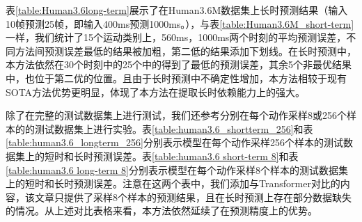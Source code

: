表\ref{table:Human3.6long-term}展示了在Human3.6M数据集上长时预测结果（输入10帧预测25帧，即输入400ms预测1000ms。），与表\ref{table:Human3.6M_short-term}一样，我们统计了15个运动类别上，560ms，1000ms两个时刻的平均预测误差，不同方法间预测误差最低的结果被加粗，第二低的结果添加下划线。在长时预测中，本方法依然在30个时刻中的25个中的得到了最低的预测误差，其余5个非最优结果中，也位于第二优的位置。且由于长时预测中不确定性增加，本方法相较于现有SOTA方法优势更明显，体现了本方法在提取长时依赖能力上的强大。

除了在完整的测试数据集上进行测试，我们还参考\parencite{li2020dynamic, mao2019learning, martinez2017human,mao2020history}分别在每个动作采样8或256个样本的的测试数据集上进行实验。表\ref{table:human3.6_shortterm_256}和表\ref{table:human3.6_longterm_256}分别表示模型在每个动作采样256个样本的测试数据集上的短时和长时预测误差。表\ref{table:human3.6 short-term 8}和表\ref{table:human3.6 long-term 8}分别表示模型在每个动作采样8个样本的测试数据集上的短时和长时预测误差。注意在这两个表中，我们添加与Transformer\parencite{aksan2021spatio}对比的内容，该文章只提供了采样8个样本的预测结果，且在长时预测上存在部分数据缺失的情况。从上述对比表格来看，本方法依然延续了在预测精度上的优势。

\clearpage

